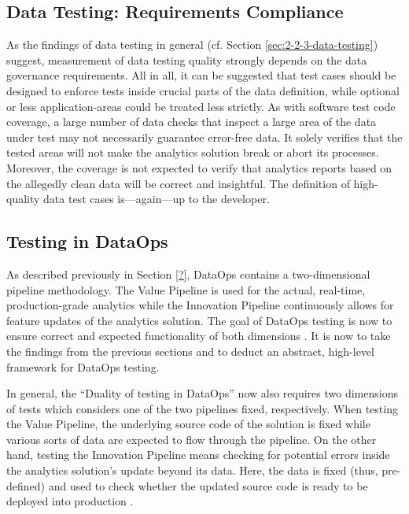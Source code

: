 \subsection{Data Testing: Requirements Compliance}
As the findings of data testing in general (cf. Section \ref{sec:2-2-3-data-testing}) suggest, measurement of data testing quality strongly depends on the data governance requirements. All in all, it can be suggested that test cases should be designed to enforce tests inside crucial parts of the data definition, while optional or less application-areas could be treated less strictly. As with software test code coverage, a large number of data checks that inspect a large area of the data under test may not necessarily guarantee error-free data. It solely verifies that the tested areas will not make the analytics solution break or abort its processes. Moreover, the coverage is not expected to verify that analytics reports based on the allegedly clean data will be correct and insightful. The definition of high-quality data test cases is—again—up to the developer.
	

\subsection{Testing in DataOps}
As described previously in Section \ref{?}, DataOps contains a two-dimensional pipeline methodology. The Value Pipeline is used for the actual, real-time, production-grade analytics while the Innovation Pipeline continuously allows for feature updates of the analytics solution. The goal of DataOps testing is now to ensure correct and expected functionality of both dimensions \cite[40\psqq]{Bergh2019}. It is now to take the findings from the previous sections and to deduct an abstract, high-level framework for DataOps testing.

In general, the \enquote{Duality of testing in DataOps} \cite[40]{Bergh2019} now also requires two dimensions of tests which considers one of the two pipelines fixed, respectively. When testing the Value Pipeline, the underlying source code of the solution is fixed while various sorts of data are expected to flow through the pipeline. On the other hand, testing the Innovation Pipeline means checking for potential errors inside the analytics solution's update beyond its data. Here, the data is fixed (thus, pre-defined) and used to check whether the updated source code is ready to be deployed into production \cite[40]{Bergh2019}. 

